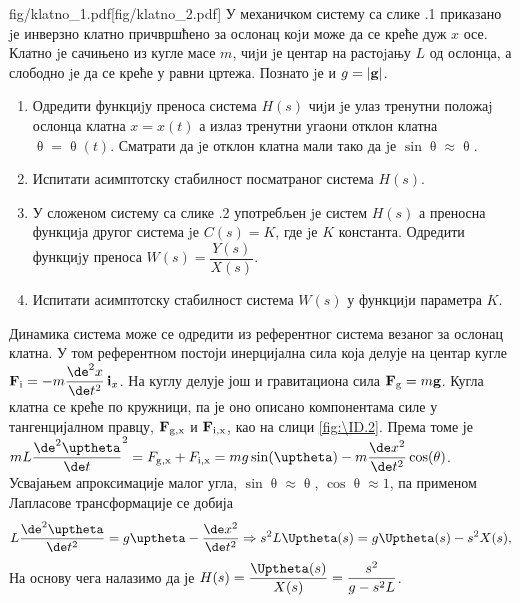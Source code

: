 \mnDifficult\begin{slikaDesno}{fig/klatno_1.pdf}[fig/klatno_2.pdf]
    \PID 
    У механичком систему са слике \ID.1 приказано jе инверзно клатно причвршћено
    за ослонац коjи може да се креће дуж $x$ осе. Клатно jе сачињено из кугле масе
    $m$, чиjи jе центар на растоjању $L$ од ослонца, а слободно jе да се креће у равни
    цртежа. Познато jе и $g = |{\bf g}|$.
    \begin{enumerate}[label=(\alph*)]
        \item Одредити функциjу преноса система $H(s)$ чиjи jе улаз тренутни положаj
              ослонца клатна $x = x(t)$ а излаз тренутни угаони отклон клатна 
              $\uptheta = \uptheta(t)$. Сматрати да jе отклон клатна мали тако да jе $\sin \uptheta \approx \uptheta$.
        \item Испитати асимптотску стабилност посматраног система $H(s)$.
        \item У сложеном систему са слике \ID.2 употребљен jе систем $H(s)$ а преносна функциjа другог система jе 
        $C(s) = K$, где jе $K$ константа. Одредити функциjу
        преноса $W(s) = \dfrac{Y(s)}{X(s)}$.
        \item Испитати асимптотску стабилност система $W(s)$ у функциjи параметра $K$.
    \end{enumerate}
\end{slikaDesno} \vspace*{5mm}

\RESENJE

Динамика система може се одредити из референтног система везаног за ослонац клатна. У том референтном постоји инерцијална сила 
која делује на центар кугле 
${\bf F}_{\rm i} = - m \dfrac{\de^2 x}{\de t^2}\,{\bf i}_x$. На куглу делује још и гравитациона сила ${\bf F}_{\rm g} = m{\bf g}$.
Кугла клатна се креће по кружници, па је оно описано компонентама силе у тангенцијалном правцу, ${\bf F}_{\rm g,x}$ и ${\bf F}_{\rm i,x}$, као
на слици \ref{fig:\ID.2}.
Према томе је $mL\dfrac{\de^2 \uptheta}{\de t}^2 = F_{\rm g,x} + F_{\rm i,x} = mg\sin(\uptheta) - m\dfrac{\de x^2}{\de t^2}\cos(\theta)$. 
Усвајањем апроксимације малог угла, $\sin\uptheta \approx \uptheta$, $\cos\uptheta \approx 1$, па применом Лапласове трансформације се добија
\begin{eqnarray}
    L\dfrac{\de^2 \uptheta}{\de t^2} = g\uptheta - \dfrac{\de x^2}{\de t^2} \Rightarrow
    s^2 L \Uptheta(s) = g\Uptheta(s) - s^2 X(s),
\end{eqnarray}
На основу чега налазимо да је $H(s) = \dfrac{\Uptheta(s)}{X(s)} = \dfrac{s^2}{g - s^2L}$. 

